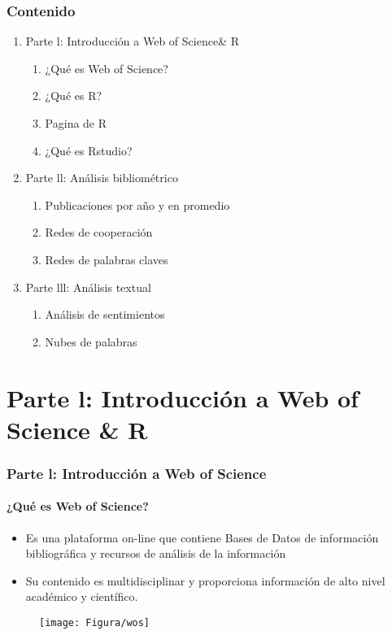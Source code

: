 \documentclass[11pt]{beamer}
\begin{document}
\begin{frame}
\frametitle{Contenido}
\begin{enumerate}[<i->]
\item<1-> Parte l: Introducción a Web of Science\& R
\begin{enumerate} [a]
\item<1-> ¿Qué es Web of Science?
\item<1-> ¿Qué es R? 
\item<1-> Pagina de R
\item<1->  ¿Qué es Rstudio?
\end{enumerate}
\item Parte ll: Análisis bibliométrico
\begin{enumerate} [a]
\item Publicaciones por año y en promedio
\item Redes de cooperación
\item Redes de palabras claves
\end{enumerate}
\item Parte lll: Análisis textual
\begin{enumerate} [a]
\item Análisis de sentimientos
\item Nubes de palabras 
\end{enumerate}
\end{enumerate}
\end{frame}



\section{Parte l: Introducción a Web of Science  \& R}
\begin{frame}
\frametitle{Parte l: Introducción a Web of Science}
\framesubtitle{¿Qué es Web of Science?}
\begin{itemize}
\item Es una plataforma on-line que contiene Bases de Datos de información bibliográfica y recursos de análisis de la información
\item Su contenido es multidisciplinar y proporciona información de alto nivel académico y científico.
\end{itemize}
\begin{figure}

\texttt{[image: Figura/wos]}
\centering
  \label{figure:Consumo}  
  \end{figure}
\end{frame}
\end{document}
